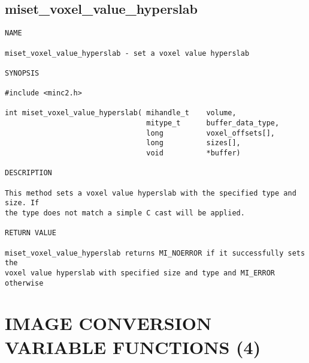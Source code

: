 \documentclass{article}
\begin{document}
\subsection{miset\_voxel\_value\_hyperslab}
\begin{verbatim}
NAME

miset_voxel_value_hyperslab - set a voxel value hyperslab

SYNOPSIS

#include <minc2.h>

int miset_voxel_value_hyperslab( mihandle_t    volume,
                                 mitype_t      buffer_data_type,
                                 long          voxel_offsets[],
                                 long          sizes[],
                                 void          *buffer)

DESCRIPTION

This method sets a voxel value hyperslab with the specified type and size. If
the type does not match a simple C cast will be applied.

RETURN VALUE

miset_voxel_value_hyperslab returns MI_NOERROR if it successfully sets the
voxel value hyperslab with specified size and type and MI_ERROR otherwise
\end{verbatim}

\section{IMAGE CONVERSION VARIABLE FUNCTIONS (4)}
\end{document}
